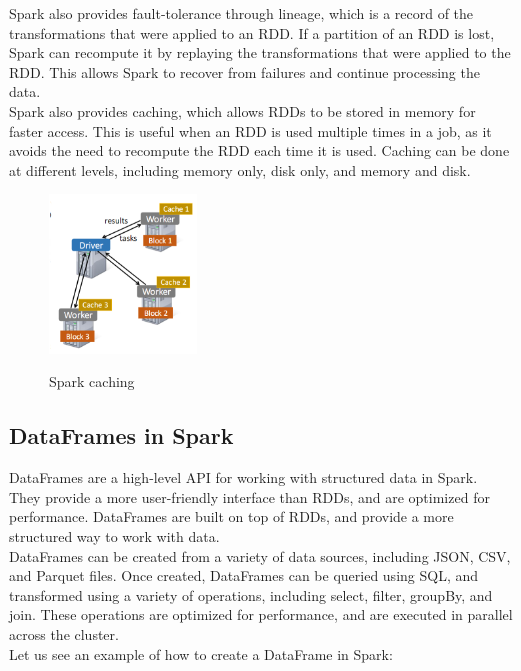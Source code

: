 Spark also provides fault-tolerance through lineage, which is a record of the transformations that
were applied to an RDD. If a partition of an RDD is lost, Spark can recompute it by replaying the
transformations that were applied to the RDD. This allows Spark to recover from failures and continue
processing the data.\\

Spark also provides caching, which allows RDDs to be stored in memory for faster access. This is useful
when an RDD is used multiple times in a job, as it avoids the need to recompute the RDD each time it
is used. Caching can be done at different levels, including memory only, disk only, and memory and disk.

\begin{figure}[H]
    \centering
    \includegraphics[width=0.35\textwidth]{figures/spark_caching.png}
    \label{fig:spark_caching}
    \caption{Spark caching}
\end{figure}

\subsection{DataFrames in Spark}

DataFrames are a high-level API for working with structured data in Spark. They provide a more
user-friendly interface than RDDs, and are optimized for performance. DataFrames are built on top
of RDDs, and provide a more structured way to work with data.\\

DataFrames can be created from a variety of data sources, including JSON, CSV, and Parquet files.
Once created, DataFrames can be queried using SQL, and transformed using a variety of operations,
including select, filter, groupBy, and join. These operations are optimized for performance, and
are executed in parallel across the cluster.\\

Let us see an example of how to create a DataFrame in Spark:

